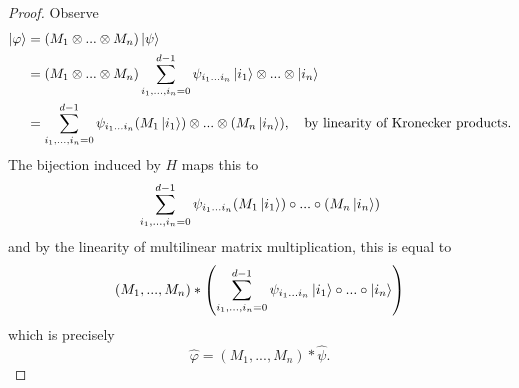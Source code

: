 \documentclass[10pt,a4paper]{amsart}
\begin{document}
\begin{proof} 
    Observe 
    \begin{align*}
        \ket{\varphi} &= (M_1\otimes...\otimes M_n) \ket{\psi} \\
        &= (M_1\otimes...\otimes M_n)\sum\limits_{i_1,...,i_n=0}^{d-1}\psi_{i_1...i_n}\ket{i_1}\otimes...\otimes \ket{i_n} \\
        &= \sum\limits_{i_1,...,i_n=0}^{d-1}\psi_{i_1...i_n}(M_1\ket{i_1})\otimes...\otimes (M_n\ket{i_n}),\quad \text{by linearity of Kronecker products.}
    \end{align*}
    The bijection induced by $H$ maps this to
    \[\sum\limits_{i_1,...,i_n=0}^{d-1}\psi_{i_1...i_n}(M_1\ket{i_1})\circ...\circ (M_n\ket{i_n})\]
    and by the linearity of multilinear matrix multiplication, this is equal to
    \[(M_1,...,M_n)*\left(\sum\limits_{i_1,...,i_n=0}^{d-1}\psi_{i_1...i_n}\ket{i_1}\circ...\circ \ket{i_n}\right)\]
    which is precisely
    \[\widehat{\varphi}=(M_1,...,M_n)*\widehat{\psi}.\]
\end{proof}
\end{document}
